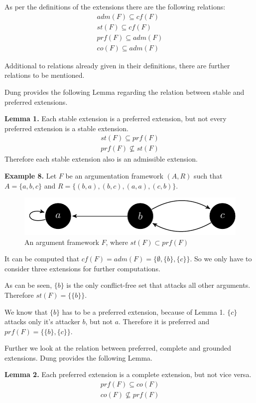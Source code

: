 \documentclass[draft,final]{vutinfth} %
\newcommand{\hl}{\par\vspace{6pt}} %
\newcommand{\cl}{\par\vspace{12pt}} %
\begin{document}
As per the definitions of the extensions there are the following relations:
\begin{align}
	adm(F)\subseteq cf(F)\\
	st(F)\subseteq cf(F)\\
	prf(F)\subseteq adm(F)\\
	co(F)\subseteq adm(F)
\end{align}\cl

Additional to relations already given in their definitions, there are further relations to be mentioned.\hl
Dung \cite{Dung} provides the following Lemma regarding the relation between stable and preferred extensions.\cl

\textbf{Lemma 1.}
Each stable extension is a preferred extension, but not every preferred extension is a stable extension.
\begin{align}
	st(F)\subseteq prf(F)\\
	prf(F)\not\subseteq st(F)
\end{align}
Therefore each stable extension also is an admissible extension.\cl

\textbf{Example 8.} Let $F$ be an argumentation framework $(A,R)$ such that $A=\{a,b,c\}$ and $R=\{(b,a),(b,c),(a,a),(c,b)\}$.\hl

\FloatBarrier
	\begin{figure}[!h]
		\centering
		\includegraphics[width=\linewidth]{graphs/ex2_v2.pdf}
		\caption{An argument framework $F$, where $st(F)\subset prf(F)$}
	\end{figure}
\FloatBarrier

It can be computed that $cf(F)=adm(F)=\{\emptyset,\{b\},\{c\}\}$. So we only have to consider three extensions for further computations.\hl
As can be seen, $\{b\}$ is the only conflict-free set that attacks all other arguments. Therefore $st(F)=\{\{b\}\}$.\hl
We know that $\{b\}$ has to be a preferred extension, because of Lemma 1. $\{c\}$ attacks only it's attacker $b$, but not $a$. Therefore it is preferred and $prf(F)=\{\{b\},\{c\}\}$.\cl

Further we look at the relation between preferred, complete and grounded extensions. Dung \cite{Dung} provides the following Lemma.\hl

\textbf{Lemma 2.}
Each preferred extension is a complete extension, but not vice versa.
\begin{align}
	prf(F)\subseteq co(F)\\
	co(F)\not\subseteq prf(F)
\end{align}\hl
\end{document}
